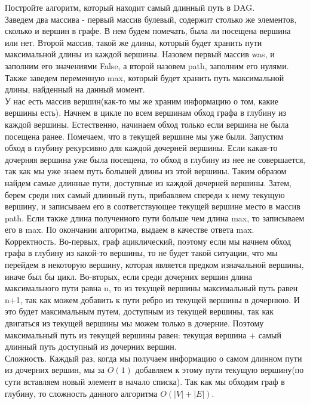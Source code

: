 \documentclass[12pt]{extreport}
\theoremstyle{definiton}
\theoremstyle{definition}
\theoremstyle{definition}
\begin{document}
	\Pr[3] Постройте алгоритм, который находит самый длинный путь в DAG.
	\newline
	\\ Заведем два массива - первый массив булевый, содержит столько же элементов, сколько и вершин в графе. В нем будем помечать, была ли посещена вершина или нет. Второй массив, такой же длины, который будет хранить пути максимальной длины из каждой вершины. Назовем первый массив was, и заполним его значениями False, а второй назовем path, заполним его нулями. Также заведем переменную max, который будет хранить путь максимальной длины, найденный на данный момент.
	\\ У нас есть массив вершин(как-то мы же храним информацию о том, какие вершины есть). Начнем в цикле по всем вершинам обход графа в глубину из каждой вершины. Естественно, начинаем обход только если вершина не была посещена ранее. Помечаем, что в текущей вершине мы уже были. Запустим обход в глубину рекурсивно для каждой дочерней вершины. Если какая-то дочерняя вершина уже была посещена, то обход в глубину из нее не совершается, так как мы уже знаем путь большей длины из этой вершины. Таким образом найдем самые длинные пути, доступные из каждой дочерней вершины. Затем, берем среди них самый длинный путь, прибавляем спереди к нему текущую вершину, и записываем его в соответствующее текущей вершине место в массив path. Если также длина полученного пути больше чем длина max, то записываем его в max. По окончании алгоритма, выдаем в качестве ответа max.
	\\ Корректность. Во-первых, граф ациклический, поэтому если мы начнем обход графа в глубину из какой-то вершины, то не будет такой ситуации, что мы перейдем в некоторую вершину, которая является предком изначальной вершины, иначе был бы цикл. Во-вторых, если среди дочерних вершин длина максимального пути равна n, то из текущей вершины максимальный путь равен n+1, так как можем добавить к пути ребро из текущей вершины в дочернюю. И это будет максимальным путем, доступным из текущей вершины, так как двигаться из текущей вершины мы можем только в дочерние. Поэтому максимальный путь из текущей вершины равен: текущая вершина + самый длинный путь доступный из дочерних вершин.
	\\Сложность. Каждый раз, когда мы получаем информацию о самом длинном пути из дочерних вершин, мы за $O(1)$ добавляем к этому пути текущую вершину(по сути вставляем новый элемент в начало списка). Так как мы обходим граф в глубину, то сложность данного алгоритма $O(|V|+|E|)$.
			
			
\end{document}
